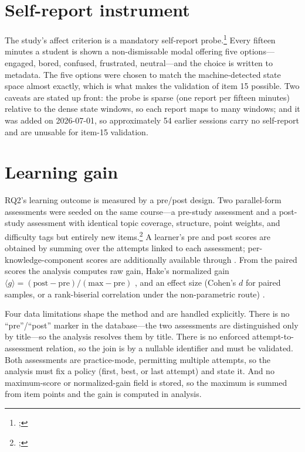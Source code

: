\section{Self-report instrument}
\label{sec:methodology-selfreport}

The study's affect criterion is a mandatory self-report
probe.\footnote{;
} Every fifteen minutes a student
is shown a non-dismissable modal offering five options---engaged, bored,
confused, frustrated, neutral---and the choice is written to
 metadata. The five options were chosen to match the
machine-detected state space almost exactly, which is what makes the
validation of item 15 possible. Two caveats are stated up front: the probe
is sparse (one report per fifteen minutes) relative to the dense state
windows, so each report maps to many windows; and it was added on
2026-07-01, so approximately 54 earlier sessions carry no self-report and
are unusable for item-15 validation. 

\section{Learning gain}
\label{sec:methodology-gain}

RQ2's learning outcome is measured by a pre/post design. Two parallel-form
assessments were seeded on the same course---a pre-study assessment and a
post-study assessment with identical topic coverage, structure, point
weights, and difficulty tags but entirely new
items.\footnote{;
} A learner's pre and post scores are
obtained by summing  over the attempts linked
to each assessment; per-knowledge-component scores are additionally
available through . From the paired scores the analysis
computes raw gain, Hake's normalized gain
$\langle g \rangle = (\text{post}-\text{pre})/(\text{max}-\text{pre})$
\citep{hake1998}, and an effect size (Cohen's $d$ for paired samples, or a
rank-biserial correlation under the non-parametric route)
\citep{cohen1988}.

Four data limitations shape the method and are handled explicitly. There
is no ``pre''/``post'' marker in the database---the two assessments are
distinguished only by title---so the analysis resolves them by title.
There is no enforced attempt-to-assessment relation, so the join is
by a nullable identifier and must be validated. Both assessments are
practice-mode, permitting multiple attempts, so the analysis must fix a
policy (first, best, or last attempt) and state it. And no maximum-score
or normalized-gain field is stored, so the maximum is summed from item
points and the gain is computed in analysis.

